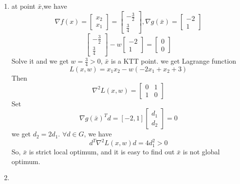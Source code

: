 \documentclass[paper=a4, fontsize=11pt]{scrartcl} %
\numberwithin{equation}{section} %
\numberwithin{figure}{section} %
\numberwithin{table}{section} %
\begin{document}
\begin{enumerate}
\item  at point $\bar{x}$,we have
\begin{equation}\nonumber
\nabla f(x) = \begin{bmatrix}x_2\\x_1\end{bmatrix} = \begin{bmatrix}-\frac{3}{2} \\ \frac{3}{4}\end{bmatrix}, \nabla g(\bar{x}) = \begin{bmatrix}-2 \\ 1\end{bmatrix}
\end{equation}
\begin{equation}\nonumber
\begin{bmatrix}-\frac{3}{2} \\ \frac{3}{4}\end{bmatrix}- w\begin{bmatrix}-2 \\ 1\end{bmatrix}=\begin{bmatrix}0\\ 0\end{bmatrix}
\end{equation}
Solve it and we get $w=\frac{3}{4}>0$, $\bar{x}$ is a KTT point.
we get Lagrange function
\begin{equation}\nonumber
L(x,w) = x_1x_2-w(-2x_1+x_2+3)
\end{equation}
Then
\begin{equation}\nonumber
\nabla^2L(x,w) = \begin{bmatrix}0 &1 \\ 1 & 0\end{bmatrix}
\end{equation}
Set 
\begin{equation}\nonumber
\nabla g(\bar{x})^Td=[-2, 1]\begin{bmatrix}d_1\\d_2\end{bmatrix}=0
\end{equation}
we get $d_2=2d_1$. $\forall d\in G$, we have
\begin{equation}\nonumber
d^T\nabla^2L(x,w)d=4d_1^2 > 0
\end{equation}
So, $\bar{x}$ is strict local optimum, and it is easy to find out $\bar{x}$ is not global optimum.
\item
\begin{equation}\nonumber

\end{equation}
\end{enumerate}
\end{document}
